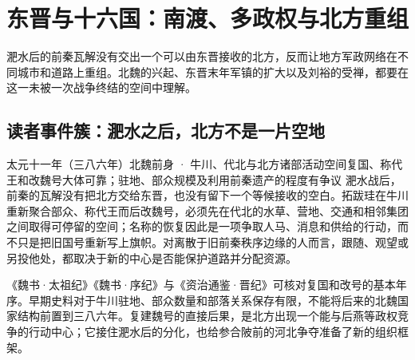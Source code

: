\chapter{东晋与十六国：南渡、多政权与北方重组}
\label{ch:eastern-jin-sixteen-kingdoms}








\begin{causalchain}[多政权空间的遗产]
淝水后的前秦瓦解没有交出一个可以由东晋接收的北方，反而让地方军政网络在不同城市和道路上重组。北魏的兴起、东晋末年军镇的扩大以及刘裕的受禅，都要在这一未被一次战争终结的空间中理解。
\end{causalchain}

\section{读者事件簇：淝水之后，北方不是一片空地}

\begin{event}{}{太元十一年（三八六年）}{北魏前身 · 牛川、代北与北方诸部活动空间}{复国、称代王和改魏号大体可靠；驻地、部众规模及利用前秦遗产的程度有争议}
淝水战后，前秦的瓦解没有把北方交给东晋，也没有留下一个等候接收的空白。拓跋珪在牛川重新聚合部众、称代王而后改魏号，必须先在代北的水草、营地、交通和相邻集团之间取得可停留的空间；名称的恢复因此是一项争取人马、消息和供给的行动，而不只是把旧国号重新写上旗帜。对离散于旧前秦秩序边缘的人而言，跟随、观望或另投他处，都取决于新的中心是否能保护道路并分配资源。

《魏书·太祖纪》《魏书·序纪》与《资治通鉴·晋纪》可核对复国和改号的基本年序。早期史料对于牛川驻地、部众数量和部落关系保存有限，不能将后来的北魏国家结构前置到三八六年。复建魏号的直接后果，是北方出现一个能与后燕等政权竞争的行动中心；它接住淝水后的分化，也给参合陂前的河北争夺准备了新的组织框架。
\end{event}

